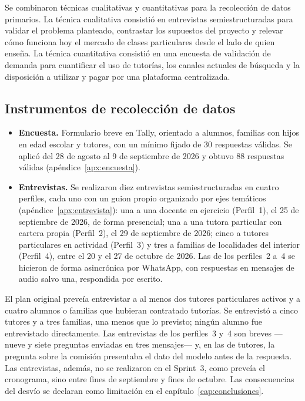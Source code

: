 Se combinaron técnicas cualitativas y cuantitativas para la recolección
de datos primarios. La técnica cualitativa consistió en entrevistas
semiestructuradas para validar el problema planteado, contrastar los
supuestos del proyecto y relevar cómo funciona hoy el mercado de clases
particulares desde el lado de quien enseña. La técnica cuantitativa
consistió en una encuesta de validación de demanda para cuantificar el
uso de tutorías, los canales actuales de búsqueda y la disposición a
utilizar y pagar por una plataforma centralizada.

\subsection{Instrumentos de recolección de datos}

\begin{itemize}
    \item \textbf{Encuesta.} Formulario breve en Tally, orientado a
          alumnos, familias con hijos en edad escolar y tutores, con un
          mínimo fijado de 30 respuestas válidas. Se aplicó del 28 de
          agosto al 9 de septiembre de 2026 y obtuvo 88 respuestas
          válidas (apéndice~\ref{apx:encuesta}).
    \item \textbf{Entrevistas.} Se realizaron diez entrevistas
          semiestructuradas en cuatro perfiles, cada uno con un guion
          propio organizado por ejes temáticos
          (apéndice~\ref{apx:entrevista}): una a una docente en ejercicio
          (Perfil~1), el 25 de septiembre de 2026, de forma presencial;
          una a una tutora particular con cartera propia (Perfil~2), el 29
          de septiembre de 2026; cinco a tutores particulares en actividad
          (Perfil~3) y tres a familias de localidades del interior
          (Perfil~4), entre el 20 y el 27 de octubre de 2026. Las de los perfiles~2 a~4 se
          hicieron de forma asincrónica por WhatsApp, con respuestas en
          mensajes de audio salvo una, respondida por escrito.
\end{itemize}

El plan original preveía entrevistar a al menos dos tutores
particulares activos y a cuatro alumnos o familias que hubieran
contratado tutorías. Se entrevistó a cinco tutores y a tres familias, una
menos que lo previsto; ningún alumno fue entrevistado directamente. Las
entrevistas de los perfiles~3 y~4 son breves ---nueve y siete preguntas
enviadas en tres mensajes--- y, en las de tutores, la pregunta sobre la
comisión presentaba el dato del modelo antes de la respuesta. Las
entrevistas, además, no se realizaron en el Sprint~3, como preveía el
cronograma, sino entre fines de septiembre y fines de octubre. Las
consecuencias del desvío se declaran como limitación en el
capítulo~\ref{cap:conclusiones}.

